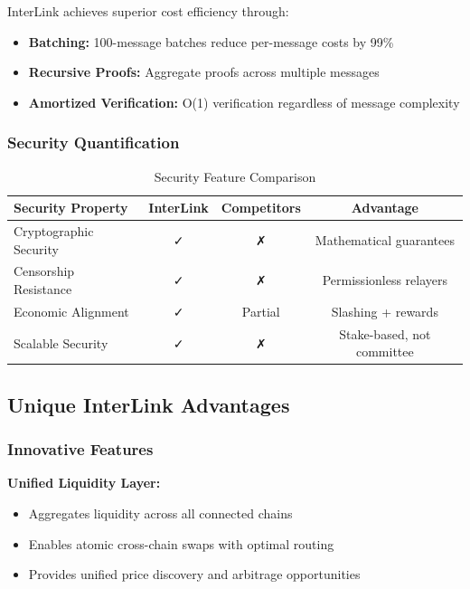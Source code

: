 \documentclass[11pt,a4paper]{article}
\begin{document}
InterLink achieves superior cost efficiency through:
\begin{itemize}
    \item \textbf{Batching:} 100-message batches reduce per-message costs by 99\%
    \item \textbf{Recursive Proofs:} Aggregate proofs across multiple messages
    \item \textbf{Amortized Verification:} O(1) verification regardless of message complexity
\end{itemize}

\subsubsection{Security Quantification}

\begin{table}[H]
\centering
\begin{tabular}{@{}lccc@{}}
\toprule
\textbf{Security Property} & \textbf{InterLink} & \textbf{Competitors} & \textbf{Advantage} \\ \midrule
Cryptographic Security & ✓ & ✗ & Mathematical guarantees \\
Censorship Resistance & ✓ & ✗ & Permissionless relayers \\
Economic Alignment & ✓ & Partial & Slashing + rewards \\
Scalable Security & ✓ & ✗ & Stake-based, not committee \\
\end{tabular}
\caption{Security Feature Comparison}
\end{table}

\subsection{Unique InterLink Advantages}

\subsubsection{Innovative Features}

\textbf{Unified Liquidity Layer:}
\begin{itemize}
    \item Aggregates liquidity across all connected chains
    \item Enables atomic cross-chain swaps with optimal routing
    \item Provides unified price discovery and arbitrage opportunities
\end{itemize}
\end{document}
